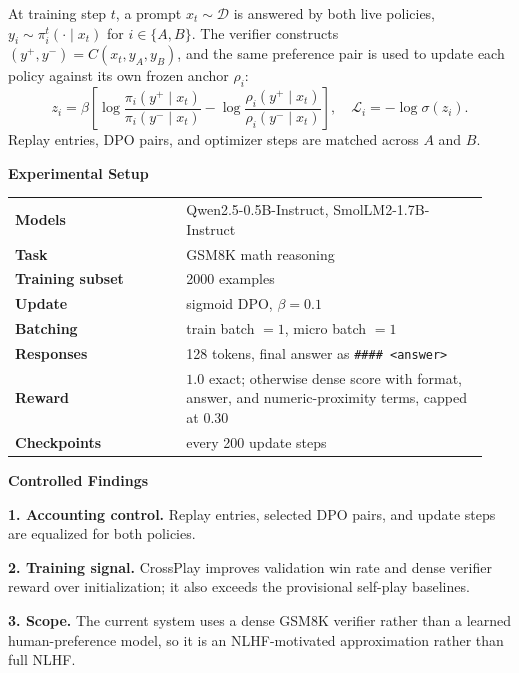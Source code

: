 \documentclass[final]{article}
\newcommand{\BlockTitle}[1]{%
  {\color{dmblue}\fontsize{32}{36}\selectfont\bfseries #1}\par
  \vspace{0.08em}{\color{linegray}\rule{\linewidth}{1.2pt}}\vspace{0.24em}
}
\newcommand{\Key}[1]{{\bfseries #1}}
\newcommand{\PosterBlock}[2]{%
  \begin{minipage}[t]{\linewidth}
  \BlockTitle{#1}
  {\fontsize{20.5}{25}\selectfont #2}
  \end{minipage}
}
\begin{document}
\begin{minipage}[t]{0.487\linewidth}
{At training step $t$, a prompt $x_t\sim\mathcal{D}$ is answered by both live
policies, $y_i\sim\pi_i^t(\cdot\mid x_t)$ for $i\in\{A,B\}$. The verifier
constructs $(y^+,y^-)=C(x_t,y_A,y_B)$, and the same preference pair is used to
update each policy against its own frozen anchor $\rho_i$:
\[
z_i=\beta\!\left[
\log\frac{\pi_i(y^+\mid x_t)}{\pi_i(y^-\mid x_t)}
-\log\frac{\rho_i(y^+\mid x_t)}{\rho_i(y^-\mid x_t)}
\right],
\quad
\mathcal{L}_{i}=-\log\sigma(z_i).
\]
Replay entries, DPO pairs, and optimizer steps are matched across $A$ and $B$.
}

\vspace{2.42em}

\PosterBlock{Experimental Setup}{
{\fontsize{22.5}{26}\selectfont
\setlength{\tabcolsep}{3.2pt}
\renewcommand{\arraystretch}{1.14}
\begin{tabular}{@{}>{\bfseries}p{0.34\linewidth}p{0.60\linewidth}@{}}
Models & Qwen2.5-0.5B-Instruct, SmolLM2-1.7B-Instruct \\
Task & GSM8K math reasoning \\
Training subset & 2000 examples \\
Update & sigmoid DPO, $\beta=0.1$ \\
Batching & train batch $=1$, micro batch $=1$ \\
Responses & 128 tokens, final answer as \texttt{\#\#\#\# <answer>} \\
Reward & $1.0$ exact; otherwise dense score with format, answer, and numeric-proximity terms, capped at $0.30$ \\
Checkpoints & every 200 update steps \\
\end{tabular}
}
}

\vspace{0.42em}

\PosterBlock{Controlled Findings}{
\Key{1. Accounting control.} Replay entries, selected DPO pairs, and update steps are equalized for both policies.

\Key{2. Training signal.} CrossPlay improves validation win rate and dense verifier reward over initialization; it also exceeds the provisional self-play baselines.

\Key{3. Scope.} The current system uses a dense GSM8K verifier rather than a learned human-preference model, so it is an NLHF-motivated approximation rather than full NLHF.
}
\end{minipage}

\vspace{5.2em}
\end{document}
